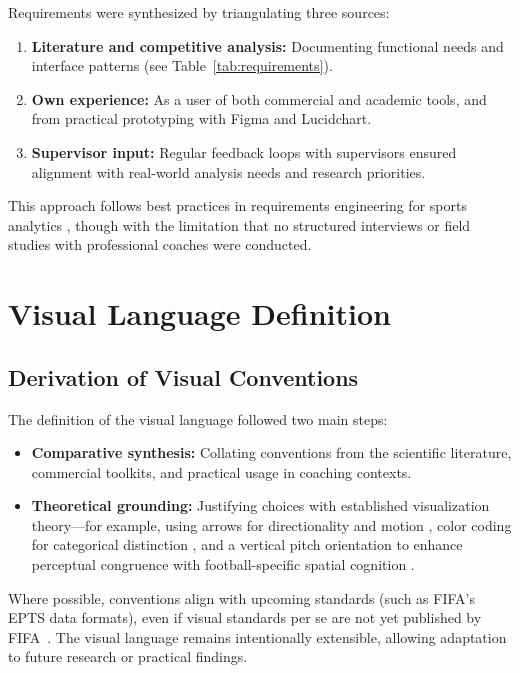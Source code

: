 \documentclass[11pt,a4paper,openright]{report}
\begin{document}
Requirements were synthesized by triangulating three sources:
\begin{enumerate}
\item \textbf{Literature and competitive analysis:} Documenting functional needs and interface patterns (see Table~\ref{tab:requirements}).
\item \textbf{Own experience:} As a user of both commercial and academic tools, and from practical prototyping with Figma and Lucidchart.
\item \textbf{Supervisor input:} Regular feedback loops with supervisors ensured alignment with real-world analysis needs and research priorities.
\end{enumerate}

This approach follows best practices in requirements engineering for sports analytics \cite{maiden2023designing, morgulev2018sports}, though with the limitation that no structured interviews or field studies with professional coaches were conducted.

\section{Visual Language Definition}

\subsection{Derivation of Visual Conventions}

The definition of the visual language followed two main steps:
\begin{itemize}
\item \textbf{Comparative synthesis:} Collating conventions from the scientific literature, commercial toolkits, and practical usage in coaching contexts.
\item \textbf{Theoretical grounding:} Justifying choices with established visualization theory—for example, using arrows for directionality and motion \cite{ware2013information, bertin2011semiology}, color coding for categorical distinction \cite{munzner2014visualization}, and a vertical pitch orientation to enhance perceptual congruence with football-specific spatial cognition \cite{perin2013soccerstories}.
\end{itemize}


Where possible, conventions align with upcoming standards (such as FIFA’s EPTS data formats), even if visual standards per se are not yet published by FIFA~\cite{fifa2024epts}. The visual language remains intentionally extensible, allowing adaptation to future research or practical findings.
\end{document}
